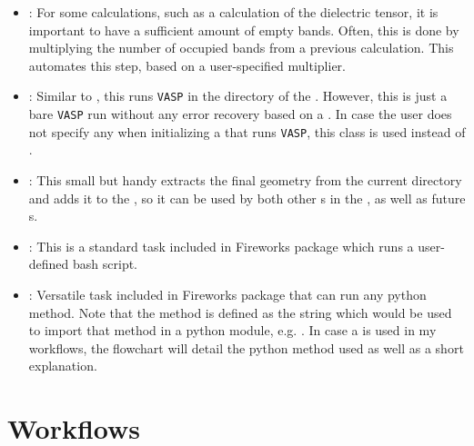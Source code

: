 \begin{refsection}
\begin{itemize}
 \label{automation:sec-IncreaseNumberOfBands} 
\item {}: For some calculations, such as a 
calculation of the dielectric tensor, it is important to have a sufficient 
amount of empty bands. Often, this is done by multiplying the number of 
occupied bands from a previous calculation. This  automates 
this step, based on a user-specified multiplier. 
 
 \label{automation:sec-VaspTask} 
\item {}: Similar to 
, this 
 runs \texttt{VASP} in the directory of the . 
However, this is just a bare \texttt{VASP} run without any error recovery 
based on a . In case the user does not specify any 
 when initializing a  that runs 
\texttt{VASP}, this class is used instead of . 
 
 \label{automation:sec-AddFinalGeometryToSpec} 
\item {}: This small but handy  
extracts the final geometry from the current directory and adds it to the 
, so it can be used by both other s in the 
, as well as future s. 
 
 \label{automation:sec-ScriptTask} 
\item {}: This is a standard task included in Fireworks package 
which runs a user-defined bash script. 
 
 \label{automation:sec-PyTask} 
\item {}: Versatile task included in Fireworks package that can run 
any python method. Note that the method is defined as the string which would 
be used to import that method in a python module, e.g. 
. In case a 
 is used in my workflows, the flowchart will detail the python 
method used as well as a short explanation. 
 
\end{itemize} 
 
\section{Workflows} \label{automation:sec-workflows} 
 

\end{refsection}
